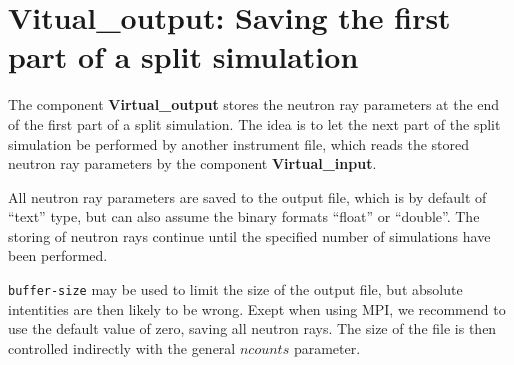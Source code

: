 \section{Vitual\_output: Saving the first part of a split simulation}
\label{virtual_output}


The component {\bf Virtual\_output} stores the neutron ray parameters
at the end of the first part of a split simulation. The idea is to let the
next part of the split simulation be performed by another instrument file,
which reads the stored neutron ray
parameters by the component {\bf Virtual\_input}.

All neutron ray parameters are saved to the output file, which is by default
of ``text'' type, but can also assume the binary formats
``float'' or ``double''. The storing of neutron rays continue until the
specified number of simulations have been performed.

\verb+buffer-size+ may be used to limit the size of the output file, but
absolute intentities are then likely to be wrong.
Exept when using MPI, we recommend to use the default value of zero, saving all neutron rays.
The size of the file is then controlled indirectly with the general $ncounts$ parameter.
